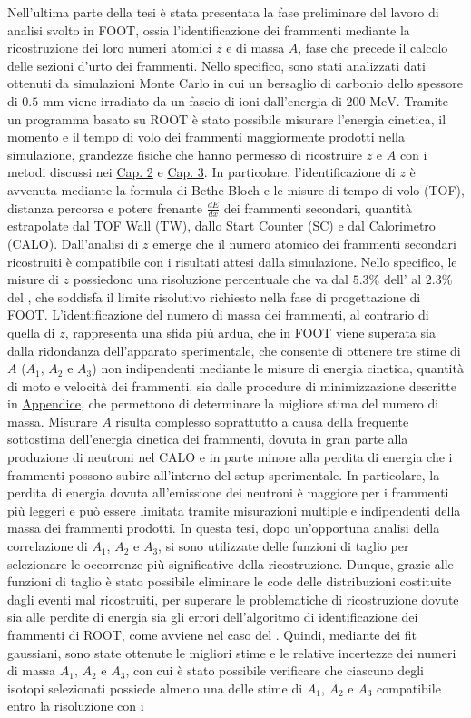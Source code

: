 \documentclass[12pt,a4paper,twoside]{report}
\begin{document}
	Nell'ultima parte della tesi è stata presentata la fase preliminare del lavoro di analisi svolto in FOOT, ossia l'identificazione dei frammenti mediante la ricostruzione dei loro numeri atomici $z$ e di massa $A$, fase che precede il calcolo delle sezioni d'urto dei frammenti. Nello specifico, sono stati analizzati dati ottenuti da simulazioni Monte Carlo in cui un bersaglio di carbonio  dello spessore di $0.5 \mbox{ mm}$ viene irradiato da un fascio di ioni  dall'energia di $200 \mbox{ MeV}$. Tramite un programma basato su ROOT è stato possibile misurare l'energia cinetica, il momento e il tempo di volo dei frammenti maggiormente prodotti nella simulazione, grandezze fisiche che hanno permesso di ricostruire $z$ e $A$ con i metodi discussi nei \hyperref[cap:2]{Cap. 2} e \hyperref[cap:3]{Cap. 3}. In particolare, l'identificazione di $z$ è avvenuta mediante la formula di Bethe-Bloch e le misure di tempo di volo (TOF), distanza percorsa e potere frenante $\frac{dE}{dx}$ dei frammenti secondari, quantità estrapolate dal TOF Wall (TW), dallo Start Counter (SC) e dal Calorimetro (CALO). Dall'analisi di $z$ emerge che il numero atomico dei frammenti secondari ricostruiti è compatibile con i risultati attesi dalla simulazione. Nello specifico, le misure di $z$ possiedono una risoluzione percentuale che va dal $5.3\%$ dell' al $2.3\%$ del , che soddisfa il limite risolutivo richiesto nella fase di progettazione di FOOT. L'identificazione del numero di massa dei frammenti, al contrario di quella di $z$, rappresenta una sfida più ardua, che in FOOT viene superata sia dalla ridondanza dell'apparato sperimentale, che consente di ottenere tre stime di $A$ ($A_1$, $A_2$ e $A_3$) non indipendenti mediante le misure di energia cinetica, quantità di moto e velocità dei frammenti, sia dalle procedure di minimizzazione descritte in \hyperref[cap:appendice]{Appendice}, che permettono di determinare la migliore stima del numero di massa. Misurare $A$ risulta complesso soprattutto a causa della frequente sottostima dell'energia cinetica dei frammenti, dovuta in gran parte alla produzione di neutroni nel CALO e in parte minore alla perdita di energia che i frammenti possono subire all'interno del setup sperimentale. In particolare, la perdita di energia dovuta all'emissione dei neutroni è maggiore per i frammenti più leggeri e può essere limitata tramite misurazioni multiple e indipendenti della massa dei frammenti prodotti. In questa tesi, dopo un'opportuna analisi della correlazione di $A_1$, $A_2$ e $A_3$, si sono utilizzate delle funzioni di taglio per selezionare le occorrenze più significative della ricostruzione. Dunque, grazie alle funzioni di taglio è stato possibile eliminare le code delle distribuzioni costituite dagli eventi mal ricostruiti, per superare le problematiche di ricostruzione dovute sia alle perdite di energia sia gli errori dell'algoritmo di identificazione dei frammenti di ROOT, come avviene nel caso del . Quindi, mediante dei fit gaussiani, sono state ottenute le migliori stime e le relative incertezze dei numeri di massa $A_1$, $A_2$ e $A_3$, con cui è stato possibile verificare che ciascuno degli isotopi selezionati possiede almeno una delle stime di $A_1$, $A_2$ e $A_3$ compatibile entro la risoluzione con i 
\end{document}

